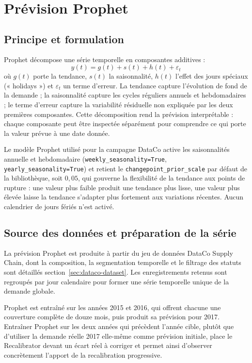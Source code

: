 \documentclass[11pt,a4paper]{article}
\newcommand{\code}[1]{\texttt{#1}}
\begin{document}
\section{Prévision Prophet}
\label{sec:prophet}

\subsection{Principe et formulation}

Prophet décompose une série temporelle en composantes additives \cite{taylor2018forecasting} :
\[
y(t) = g(t) + s(t) + h(t) + \varepsilon_t
\]
où \(g(t)\) porte la tendance, \(s(t)\) la saisonnalité, \(h(t)\) l'effet des jours spéciaux (« holidays ») et \(\varepsilon_t\) un terme d'erreur. La tendance capture l'évolution de fond de la demande ; la saisonnalité capture les cycles réguliers annuels et hebdomadaires ; le terme d'erreur capture la variabilité résiduelle non expliquée par les deux premières composantes. Cette décomposition rend la prévision interprétable : chaque composante peut être inspectée séparément pour comprendre ce qui porte la valeur prévue à une date donnée.

Le modèle Prophet utilisé pour la campagne DataCo active les saisonnalités annuelle et hebdomadaire (\code{weekly\_seasonality=True}, \code{yearly\_seasonality=True}) et retient le \code{changepoint\_prior\_scale} par défaut de la bibliothèque, soit \(0{,}05\), qui gouverne la flexibilité de la tendance aux points de rupture : une valeur plus faible produit une tendance plus lisse, une valeur plus élevée laisse la tendance s'adapter plus fortement aux variations récentes. Aucun calendrier de jours fériés n'est activé.

\subsection{Source des données et préparation de la série}

La prévision Prophet est produite à partir du jeu de données DataCo Supply Chain, dont la composition, la segmentation temporelle et le filtrage des statuts sont détaillés section~\ref{sec:dataco-dataset}. Les enregistrements retenus sont regroupés par jour calendaire pour former une série temporelle unique de la demande globale.

Prophet est entraîné sur les années 2015 et 2016, qui offrent chacune une couverture complète de douze mois, puis produit sa prévision pour 2017. Entraîner Prophet sur les deux années qui précèdent l'année cible, plutôt que d'utiliser la demande réelle 2017 elle-même comme prévision initiale, place le Recalibrator devant un écart réel à corriger et permet ainsi d'observer concrètement l'apport de la recalibration progressive.
\end{document}
